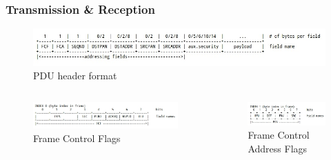 \begin{frame}[fragile]
  \frametitle{Transmission \& Reception}
  \begin{figure}
  	\centering
  	\includegraphics[width=\textwidth]{img/header.jpg}
  	\caption{PDU header format}
  \end{figure}
  \begin{columns}
  	\begin{column}{.52\textwidth}
	    \begin{figure}
	    	\includegraphics[width=\textwidth]{img/fcf.jpg}
  		\caption{Frame Control Flags}
	    \end{figure}
  	\end{column}
  	\hfill
	\begin{column}{.45\textwidth}
	    \begin{figure}
	    	\includegraphics[width=\textwidth]{img/fca.jpg}
  		\caption{Frame Control Address Flags}
	    \end{figure}
  	\end{column}
  \end{columns}
\end{frame}
% 

